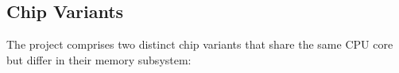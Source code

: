 
\subsection{Chip Variants}
\label{subsec:chipVariants}

The \aschip project comprises two distinct chip variants that share the same
CPU core but differ in their memory subsystem:

